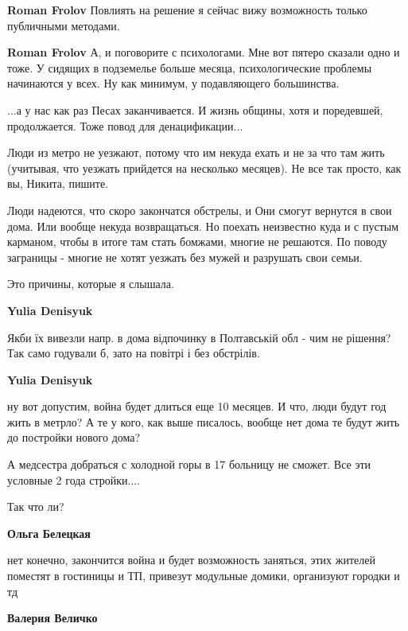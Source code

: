 \begin{itemize}
\begin{itemize}
\textbf{Roman Frolov} Повлиять на решение я сейчас вижу возможность только публичными методами.

\textbf{Roman Frolov} А, и поговорите с психологами. Мне вот пятеро сказали одно и тоже. У сидящих в подземелье больше месяца, психологические проблемы начинаются у всех. Ну как минимум, у подавляющего большинства.

\end{itemize} %


...а у нас как раз Песах заканчивается. И жизнь общины, хотя и поредевшей,
продолжается. Тоже повод для денацификации...


Люди из метро не уезжают, потому что им некуда ехать и не за что там жить
(учитывая, что уезжать прийдется на несколько месяцев). Не все так просто, как
вы, Никита, пишите.

Люди надеются, что скоро закончатся обстрелы, и Они смогут вернутся в свои
дома. Или вообще некуда возвращаться. Но поехать неизвестно куда и с пустым
карманом, чтобы в итоге там стать бомжами, многие не решаются. По поводу
заграницы - многие не хотят уезжать без мужей и разрушать свои семьи.

Это причины, которые я слышала.

\begin{itemize} %
\textbf{Yulia Denisyuk} 

Якби їх вивезли напр. в дома відпочинку в Полтавській обл - чим не рішення? Так
само годували б, зато на повітрі і без обстрілів.

\textbf{Yulia Denisyuk} 

ну вот допустим, война будет длиться еще 10 месяцев. И что, люди будут год жить
в метрло? А те у кого, как выше писалось, вообще нет дома те будут жить до
постройки нового дома?

А медсестра добраться с холодной горы в 17 больницу не сможет. Все эти условные
2 года стройки....

Так что ли?

\textbf{Ольга Белецкая} 

нет конечно, закончится война и будет возможность заняться, этих жителей
поместят в гостиницы и ТП, привезут модульные домики, организуют городки и тд

\textbf{Валерия Величко} 


\end{itemize}
\end{itemize}
